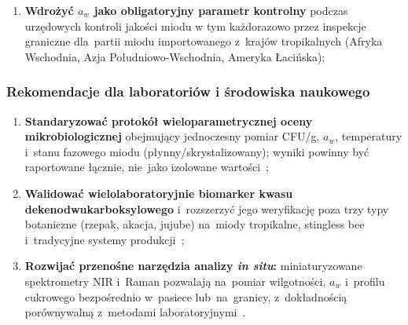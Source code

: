 \begin{enumerate}
    \item \textbf{Wdrożyć $a_w$ jako obligatoryjny parametr
          kontrolny} podczas urzędowych kontroli jakości miodu w tym każdorazowo przez inspekcje graniczne dla~partii miodu
          importowanego z~krajów tropikalnych (Afryka Wschodnia,
          Azja Południowo-Wschodnia, Ameryka Łacińska);          
\end{enumerate}

\subsubsection{Rekomendacje dla laboratoriów i środowiska naukowego}

\begin{enumerate}
    \item \textbf{Standaryzować protokół wieloparametrycznej
          oceny mikrobiologicznej} obejmujący jednoczesny
          pomiar CFU/g, $a_w$, temperatury i~stanu fazowego
          miodu (płynny/skrystalizowany); wyniki powinny
          być raportowane łącznie, nie~jako izolowane
          wartości~\cite{zamora2006,analytica2020};
    \item \textbf{Walidować wielolaboratoryjnie biomarker
          kwasu dekenodwukarboksylowego} i~rozszerzyć jego
          weryfikację poza trzy typy botaniczne (rzepak,
          akacja, jujube) na~miody tropikalne, stingless bee
          i~tradycyjne systemy produkcji~\cite{sun2021};
    \item \textbf{Rozwijać przenośne narzędzia analizy \textit{in situ}:}
          miniaturyzowane spektrometry NIR i~Raman
          pozwalają na~pomiar wilgotności, $a_w$
          i~profilu cukrowego bezpośrednio w~pasiece
          lub~na~granicy, z~dokładnością porównywalną
          z~metodami laboratoryjnymi~\cite{honeyid2025,schoder2026}.
\end{enumerate}